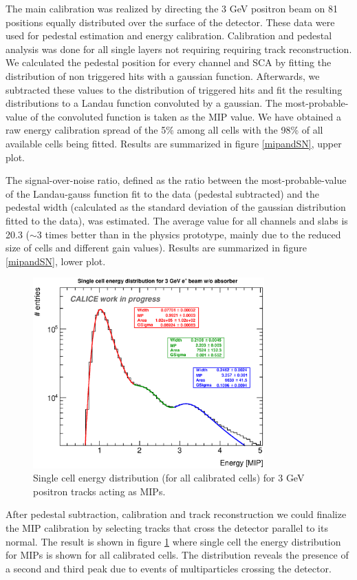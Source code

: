 \documentclass[journal]{IEEEtran}
\begin{document}
The main calibration was realized 
by directing the 3 GeV positron beam on 81 positions equally distributed over the surface of the detector.
These data were used for pedestal estimation and energy calibration.
Calibration and pedestal analysis was done for all single layers not requiring requiring track reconstruction.
We calculated the pedestal position for every channel and SCA by fitting the distribution of non triggered hits with a gaussian function.
Afterwards, we subtracted these values to the distribution of triggered hits and fit the resulting distributions to a Landau function convoluted by a gaussian.
The most-probable-value of the convoluted function is taken as the MIP value.
We have obtained a raw energy calibration spread of the 5\% among all cells with the 98\% of all available cells being fitted. Results are summarized in figure \ref{mipandSN}, upper plot.

The signal-over-noise ratio, defined as the ratio between the most-probable-value of
the Landau-gauss function fit to the data (pedestal subtracted) and the pedestal width
(calculated as the standard deviation of the gaussian distribution fitted to the data), was estimated.
The average value for all channels and slabs is 20.3 ($\sim 3$ times better than in the physics prototype, mainly due to the reduced size of cells and different gain values).
Results are summarized in figure \ref{mipandSN}, lower plot.

\begin{figure}[!t]
\centering
\includegraphics[width=3.5in]{mip3peaks.eps}
\caption{Single cell energy distribution (for all calibrated cells) for 3 GeV positron tracks acting as MIPs. }
\label{miplog}
\end{figure}

After pedestal subtraction, calibration and track reconstruction we could finalize the MIP calibration by selecting tracks that cross the detector parallel to its normal.
The result is shown in figure \ref{miplog} where single cell the energy distribution for MIPs is shown for all calibrated cells.
The distribution reveals the presence of a second and third peak due to events of multiparticles crossing the detector.
\end{document}
